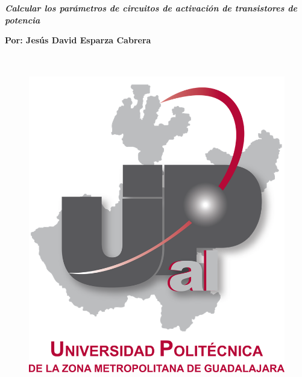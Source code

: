 \documentclass[12pt]{article}
\begin{document}
\par 

\vspace{\baselineskip}
{\fontsize{28pt}{33.6pt}\selectfont \textbf{\textit{\textcolor[HTML]{00508F}{Calcular los parámetros de circuitos de activación de transistores de potencia}}}\par}\par


\vspace{\baselineskip}
{\fontsize{26pt}{31.2pt}\selectfont \textbf{Por: Jesús David Esparza Cabrera}\par}\par




\begin{figure}[H]
	\begin{Center}
		\includegraphics[width=5.39in,height=5.87in]{./media/image1.png}
	\end{Center}
\end{figure}
\end{document}
